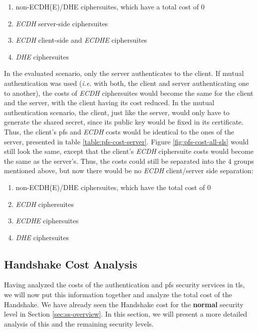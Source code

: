 \begin{enumerate}
  \item non-ECDH(E)/DHE ciphersuites, which have a total cost of $0$
  \item \textit{ECDH} server-side ciphersuites
  \item \textit{ECDH} client-side and \textit{ECDHE} ciphersuites
  \item \textit{DHE} ciphersuites
\end{enumerate}

In the evaluated scenario, only the server authenticates to the client. If mutual authentication was used (\textit{i.e.} with both, the client
and server authenticating one to another), the costs of \textit{ECDH} ciphersuites would become the same for the client and the server, with the client
having its cost reduced. In the mutual authentication scenario, the client, just like the server, would only have to generate the shared secret, since
its public key would be fixed in its certificate. Thus, the client's \gls{pfs} and \textit{ECDH} costs would be identical to the ones of the server,
presented in table \ref{table:pfs-cost-server}. Figure \ref{fig:pfs-cost-all-sls} would still look the same, except that the client's \textit{ECDH}
ciphersuite costs would become the same as the server's. Thus, the costs could still be separated into the $4$ groups mentioned above,
but now there would be no \textit{ECDH} client/server side separation:

\begin{enumerate}
  \item non-ECDH(E)/DHE ciphersuites, which have the total cost of $0$
  \item \textit{ECDH} ciphersuites
  \item \textit{ECDHE} ciphersuites
  \item \textit{DHE} ciphersuites
\end{enumerate}

\subsection{Handshake Cost Analysis} \label{sec:tls-hs-cost}

Having analyzed the costs of the authentication and \gls{pfs} security services in \gls{tls}, we will now put this information together and
analyze the total cost of the Handshake. We have already seen the Handshake cost for the \textbf{normal} security level in
Section \ref{sec:ss-overview}. In this section, we will present a more detailed analysis of this and the remaining security levels.

